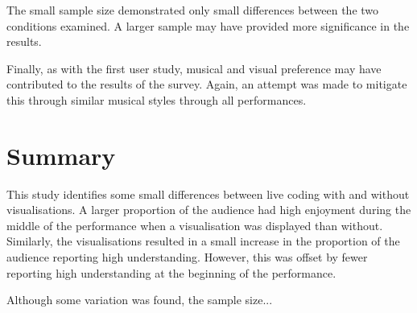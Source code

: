 The small sample size demonstrated only small differences between the two conditions examined. A larger sample may have provided more significance in the results. \more

Finally, as with the first user study, musical and visual preference may have contributed to the results of the survey. Again, an attempt was made to mitigate this through similar musical styles through all performances.

\section{Summary}

This study identifies some small differences between live coding with and without visualisations. A larger proportion of the audience had high enjoyment during the middle of the performance when a visualisation was displayed than without. Similarly, the visualisations resulted in a small increase in the proportion of the audience reporting high understanding. However, this was offset by fewer reporting high understanding at the beginning of the performance. 

Although some variation was found, the sample size... \more









